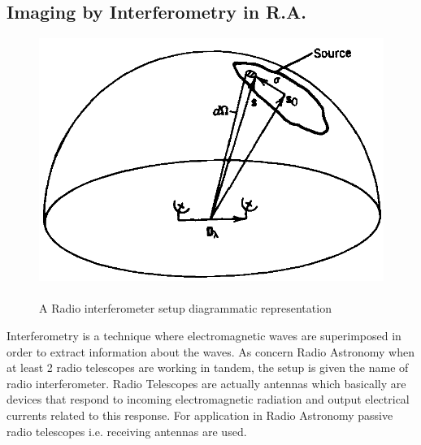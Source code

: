\subsection{Imaging by Interferometry in R.A.}
\label{sec:intIntro}
\begin{figure}[htbp]

  \begin{center}
    \includegraphics[scale= 1.3]{Figures/sSource}
  \end{center}
  
 	\caption[Diagrammatic representation of an elementary radio interferometer setup]{\\ A Radio interferometer setup diagrammatic representation~\citep[Pg.~69,~Fig.~3.1]{thompson2008interferometry}}
	\label{fig:RadioIntSphere}
	
\end{figure}
Interferometry is a technique where electromagnetic waves are superimposed in order to extract information about the waves. As concern Radio Astronomy when at least 2 radio telescopes are working in tandem, the setup is given the name of radio interferometer. Radio Telescopes are actually antennas which basically are devices that respond to incoming electromagnetic radiation and output electrical currents related to this response.
For application in Radio Astronomy passive radio telescopes i.e. receiving antennas are used.

